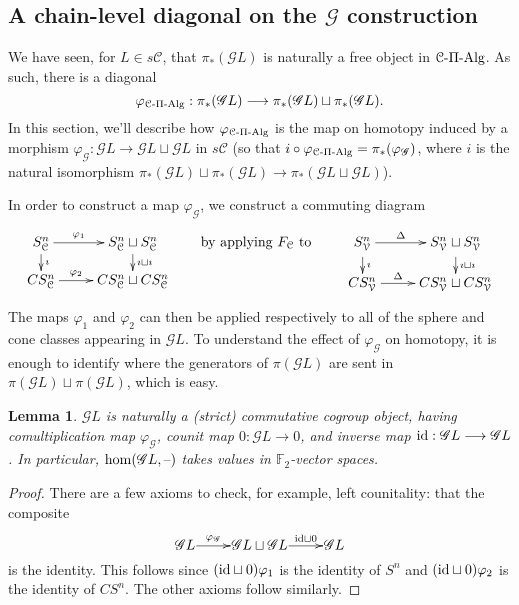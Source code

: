 \documentclass[11pt]{amsart}
\theoremstyle{plain}
\newtheorem{lem}[thm]{Lemma}
\theoremstyle{definition}
\newcommand{\DASH}{\textup{--}}
\let\phi\varphi
\renewcommand{\to}{\longrightarrow}
\newcommand{\scrQ}{\mathscr{Q}}
\newcommand{\scrR}{\mathscr{R}}
\newcommand{\scrT}{\mathscr{T}}
\newcommand{\scrY}{\mathscr{Y}}
\newcommand{\scrI}{\mathscr{I}}
\newcommand{\scrO}{\mathscr{O}}
\newcommand{\scrP}{\mathscr{P}}
\newcommand{\scrS}{\mathscr{S}}
\newcommand{\scrG}{\mathscr{G}}
\newcommand{\scrH}{\mathscr{H}}
\newcommand{\scrJ}{\mathscr{J}}
\newcommand{\scrK}{\mathscr{K}}
\newcommand{\scrL}{\mathscr{L}}
\newcommand{\scrZ}{\mathscr{Z}}
\newcommand{\scrN}{\mathscr{N}}
\newcommand{\scrM}{\mathscr{M}}
\newcommand{\calC}{\mathcal{C}}
\newcommand{\calV}{\mathcal{V}}
\theoremstyle{plain}
\newcommand{\vect}[2]{\calV^{#1}_{#2}}
\newcommand{\BSW}{{\scrG}}%
\newcommand{\PiAlg}{\textup{-$\Pi$-Alg}}
\newcommand{\F}{\mathbb{F}}
\begin{document}
\begin{Composite functor spectral sequences}





\subsection{A chain-level diagonal on the $\BSW $ construction}
\label{Subsection: Chain level diagonal}
We have seen, for $L\in s\calC$, that $\pi_*(\BSW L)$ is naturally a free object in $\calC\PiAlg$. As such, there is a diagonal
\[\phi_{\calC\PiAlg}:\pi_*(\BSW L)\to \pi_*(\BSW L)\sqcup \pi_*(\BSW L).\]
In this section, we'll describe how $\phi_{\calC\PiAlg}$ is the map on homotopy induced by a morphism $\phi_\BSW :\BSW L\to \BSW L\sqcup \BSW L$ in $s\calC$ (so that $i\circ\phi_{\calC\PiAlg}=\pi_*(\phi_{\BSW})$, where $i$ is the natural isomorphism $\pi_*(\BSW L)\sqcup\pi_*(\BSW L)\to \pi_*(\BSW L\sqcup \BSW L)$).

In order to construct a map $\phi_\BSW $, we construct a commuting diagram
\[\xymatrix@R=4mm{
S^n_{\calC}\ar[r]^-{\phi_1}
\ar[d]^-{\imath}
&%
S^n_{\calC}\sqcup S^n_{\calC}\ar[d]^-{\imath\sqcup\imath}
\\%
CS^n_{\calC}\ar[r]^-{\phi_2}
&%
CS^n_{\calC}\sqcup CS^n_{\calC}%
}\qquad \textup{by applying $F_\calC$ to }\qquad \xymatrix@R=4mm{
S^n_{\vect{}{}}\ar[r]^-{\Delta}
\ar[d]^-{\imath}
&%
S^n_{\vect{}{}}\sqcup S^n_{\vect{}{}}\ar[d]^-{\imath\sqcup\imath}
\\%
CS^n_{\vect{}{}}\ar[r]^-{\Delta}
&%
CS^n_{\vect{}{}}\sqcup CS^n_{\vect{}{}}%
}\]
The maps $\phi_1$ and $\phi_2$ can then be applied respectively to all of the sphere and cone classes appearing in $\BSW L$.
To understand the effect of $\phi_{\BSW }$ on homotopy, it is enough to identify where the generators of $\pi(\BSW L)$ are sent in $\pi(\BSW L)\sqcup\pi(\BSW L)$, which is easy.
\begin{lem}
$\BSW L$ is naturally a (strict) commutative cogroup object, having comultiplication map $\phi_{\BSW }$, counit map $0:\BSW L\to 0$, and inverse map $\textup{id}:\BSW L\to \BSW L$. In particular, $\hom(\BSW L,\DASH)$ takes values in $\ensuremath{\F_2}$-vector spaces.
\end{lem}
\begin{proof}
There are a few axioms to check, for example, left counitality: that the composite 
\[\xymatrix@R=4mm@1{
\BSW L\ar[r]^-{\phi_{\BSW }}
&%
\BSW L\sqcup \BSW L\ar[r]^-{\textup{id}\sqcup0}
&%
\BSW L%
}\] is the identity. This follows since $(\textup{id}\sqcup0)\phi_1$ is the identity of $S^n$ and $(\textup{id}\sqcup0)\phi_2$ is the identity of $CS^n$. The other axioms follow similarly.
\end{proof}


\end{Composite functor spectral sequences}
\end{document}
